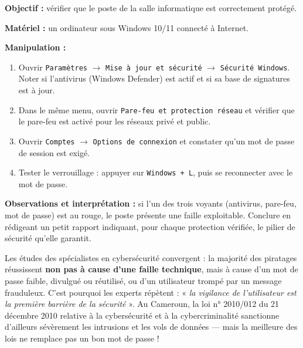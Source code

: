 \documentclass[11pt]{article}
\begin{document}
\begin{experience}
\textbf{Objectif :} vérifier que le poste de la salle informatique est correctement protégé.\par
\textbf{Matériel :} un ordinateur sous Windows 10/11 connecté à Internet.\par
\textbf{Manipulation :}
\begin{enumerate}
\item Ouvrir \texttt{Paramètres} $\rightarrow$ \texttt{Mise à jour et sécurité} $\rightarrow$ \texttt{Sécurité Windows}. Noter si l'antivirus (Windows Defender) est actif et si sa base de signatures est à jour.
\item Dans le même menu, ouvrir \texttt{Pare-feu et protection réseau} et vérifier que le pare-feu est activé pour les réseaux privé et public.
\item Ouvrir \texttt{Comptes} $\rightarrow$ \texttt{Options de connexion} et constater qu'un mot de passe de session est exigé.
\item Tester le verrouillage : appuyer sur \texttt{Windows + L}, puis se reconnecter avec le mot de passe.
\end{enumerate}
\textbf{Observations et interprétation :} si l'un des trois voyants (antivirus, pare-feu, mot de passe) est au rouge, le poste présente une faille exploitable. Conclure en rédigeant un petit rapport indiquant, pour chaque protection vérifiée, le pilier de sécurité qu'elle garantit.
\end{experience}

\begin{savaistu}
Les études des spécialistes en cybersécurité convergent : la majorité des piratages réussissent \textbf{non pas à cause d'une faille technique}, mais à cause d'un mot de passe faible, divulgué ou réutilisé, ou d'un utilisateur trompé par un message frauduleux. C'est pourquoi les experts répètent : « \emph{la vigilance de l'utilisateur est la première barrière de la sécurité} ». Au Cameroun, la loi n° 2010/012 du 21 décembre 2010 relative à la cybersécurité et à la cybercriminalité sanctionne d'ailleurs sévèrement les intrusions et les vols de données — mais la meilleure des lois ne remplace pas un bon mot de passe !
\end{savaistu}
\end{document}
